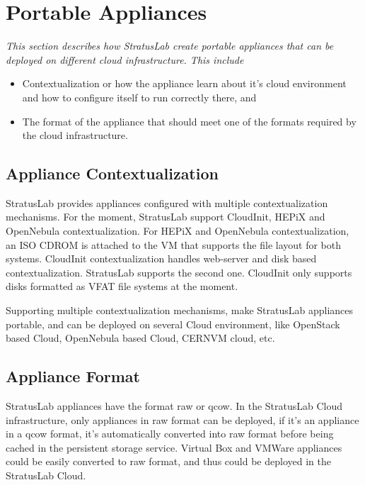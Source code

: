 \section{Portable Appliances}

{\em This section describes how StratusLab create portable appliances that can be deployed on different cloud infrastructure. This include 
\begin{itemize}
\item Contextualization or how the appliance learn about it's cloud environment and how to configure itself to run correctly there, and 
\item  The format of the appliance that should meet one of the formats required by the cloud infrastructure.
\end{itemize}
\subsection{Appliance Contextualization}
StratusLab provides appliances configured with multiple contextualization mechanisms. For the moment, StratusLab support CloudInit, HEPiX and OpenNebula contextualization.
For HEPiX and OpenNebula contextualization, an ISO CDROM is attached to the VM that supports the file layout for both systems.
CloudInit contextualization handles web-server and disk based contextualization. StratusLab supports the second one. CloudInit only supports disks formatted as VFAT file systems at the moment.

Supporting multiple contextualization mechanisms, make StratusLab appliances portable, and can be deployed on several Cloud environment, like OpenStack based Cloud, OpenNebula based Cloud, CERNVM cloud, etc.

\subsection{Appliance Format}
StratusLab appliances have the format raw or qcow. In the StratusLab Cloud infrastructure, only appliances in raw format can be deployed, if it's an appliance in a qcow format, it's automatically converted into raw format before being cached in the persistent storage service. Virtual Box and VMWare appliances could be easily converted to raw format, and thus could be deployed in the StratusLab Cloud.}

